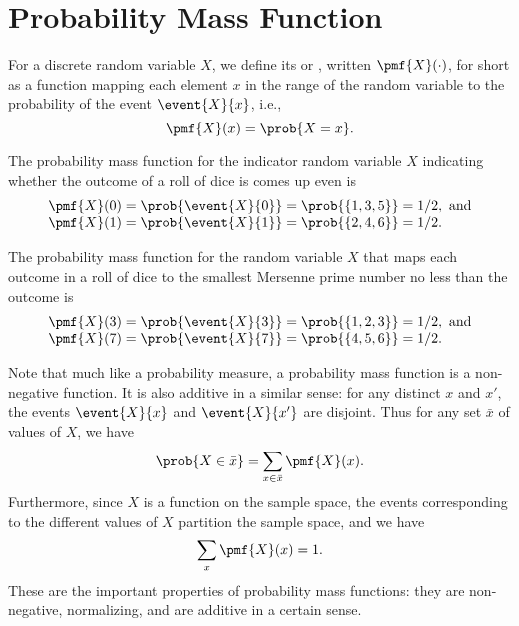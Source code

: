 \section{Probability Mass Function}
\label{sec:probability::randvar::pmf}

\begin{flex}
\label{grp:def:probability::randvar::probability-mass-function}

\begin{definition}
\label{def:probability::randvar::probability-mass-function}
For a discrete random variable $X$, we define its  or , written $\pmf{X}(\cdot)$, for short as
a function mapping each element $x$ in the range of the random
variable to the probability of the event $\event{X}{x}$, i.e.,
\[
\pmf{X}(x) = \prob{X = x}.
\]

\end{definition}

\begin{example}
\label{xmpl:probability::randvar::probability}
The probability mass function for the indicator random variable $X$
indicating whether the outcome of a roll of dice is comes up even is 
\[
\begin{array}{lll}
\pmf{X}(0) = \prob{\event{X}{0}} = \prob{\{1, 3, 5\}} =
1/2,~\mbox{and}
\\
\pmf{X}(1) = \prob{\event{X}{1}} = \prob{\{2, 4, 6\}} =
1/2.
\end{array}
\]

The probability mass function for the random variable $X$
that maps each outcome in a roll of dice to the smallest Mersenne
prime number no less than the outcome is
\[
\begin{array}{lll}
\pmf{X}(3) = \prob{\event{X}{3}} = \prob{\{1, 2, 3\}} =
1/2,~\mbox{and}
\\
\pmf{X}(7) = \prob{\event{X}{7}} = \prob{\{4, 5, 6\}} =
1/2.
\end{array}
\]

\end{example}
\end{flex}

\begin{cluster}
\label{grp:grm:probability::randvar::probability}

\begin{gram}
\label{grm:probability::randvar::probability}
Note that much like a probability measure, a probability mass function is
a non-negative function.
It is also additive in a similar sense: for any distinct $x$ and $x'$, the
events $\event{X}{x}$ and $\event{X}{x'}$ are disjoint.
Thus for any set $\bar{x}$ of values of $X$, we have 
\[
\prob{X \in \bar{x}} = \sum_{x \in \bar{x}}{\pmf{X}(x)}.
\]
Furthermore, since $X$ is a function on the sample space, the events
corresponding to the different values of $X$ partition the sample
space, and we have
\[
\sum_{x}{\pmf{X}(x)} = 1.
\]
These are the important properties of probability mass functions: they
are non-negative, normalizing, and are additive in a certain sense. 

\end{gram}
\end{cluster}

